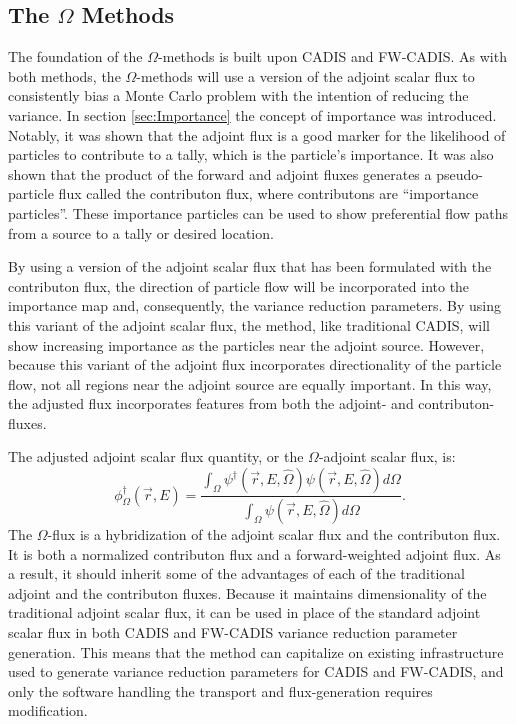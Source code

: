 \subsection{The $\Omega$ Methods}
\label{sec:omegaintro}

The foundation of the $\Omega$-methods is built upon CADIS and FW-CADIS. As with
both methods,
the $\Omega$-methods will use a version of the adjoint scalar flux to
consistently bias a Monte Carlo problem with the intention of reducing the
variance. In section \ref{sec:Importance} the concept of importance was
introduced. Notably, it was shown that the adjoint flux is a good marker
for the likelihood of particles to contribute to a tally, which is the
particle's importance. It was also shown that the
product of the forward and adjoint fluxes generates a pseudo-particle flux called
the contributon flux, where contributons are ``importance particles''.
These importance particles can be used to show preferential flow paths from a
source to a tally or desired location.

By using a version of the adjoint scalar flux that has been formulated with the
contributon flux, the direction of particle flow will be incorporated into the
importance map and, consequently, the
variance reduction parameters. By using this variant of the adjoint scalar flux,
the method, like traditional CADIS, will show increasing importance as the
particles near the adjoint source. However, because this variant of the adjoint
flux incorporates directionality of the particle flow, not all regions near the
adjoint source are equally important. In this way, the adjusted flux
incorporates features from both the adjoint- and contributon- fluxes.

The adjusted adjoint scalar flux quantity, or the $\Omega$-adjoint
scalar flux, is:
%
\begin{equation}
  \phi^{\dagger}_{\Omega}(\vec {r} ,E)  = \frac{\int_{\Omega}{\psi^{\dagger}
                             (\vec{r}, E, \hat\Omega)
                             \psi(\vec{r}, E, \hat\Omega)} d\Omega}
                             {\int_{\Omega}\psi(\vec{r}, E, \hat\Omega)
                           d\Omega}.
\label{eq:omega_basic}
\end{equation}
%
The $\Omega$-flux is a hybridization of the adjoint scalar flux and the contributon
flux. It is both a normalized contributon flux and a forward-weighted
adjoint flux. As a result, it should inherit some of the advantages of
each of the traditional
adjoint and the contributon fluxes. Because it maintains dimensionality of the
traditional adjoint scalar flux, it can be used in place of the standard adjoint
scalar flux in both
CADIS and FW-CADIS variance reduction parameter generation.
This means that the method can capitalize on existing infrastructure used to
generate variance reduction parameters for CADIS and FW-CADIS, and only the
software handling the transport and flux-generation requires modification.


